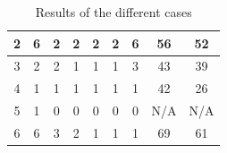 \documentclass[12pt,a4paper,oneside]{article}
\numberwithin{equation}{section}
\numberwithin{equation}{section}
\theoremstyle{definition}
\begin{document}
\begin{itemize}
\begin{table}[h!]
\begin{tabular}{|c|c|c|c|c|c|c|c|c|}
2             & 6                                                                 & 2                                                                 & 2                                                                 & 2                                                                 & 2                                                                 & 6                                                                 & \cellcolor[HTML]{FFFC9E}56                                     & 52                                                                  \\ \hline
3             & 2                                                                 & 2                                                                 & 1                                                                 & 1                                                                 & 1                                                                 & 3                                                                 & \cellcolor[HTML]{FFFC9E}43                                     & 39                                                                  \\ \hline
4             & 1                                                                 & 1                                                                 & 1                                                                 & 1                                                                 & 1                                                                 & 1                                                                 & \cellcolor[HTML]{FFCCC9}42                                     & 26                                                                  \\ \hline
5             & 1                                                                 & 0                                                                 & 0                                                                 & 0                                                                 & 0                                                                 & 0                                                                 & N/A                                                            & N/A                                                                 \\ \hline
6             & 6                                                                 & 3                                                                 & 2                                                                 & 1                                                                 & 1                                                                 & 1                                                                 & \cellcolor[HTML]{FFFC9E}69                                     & 61                                                                  \\ \hline
\end{tabular}
\caption{Results of the different cases}
\label{results}
\end{table}


\end{itemize}
\end{document}
